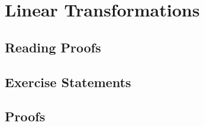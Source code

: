 \chapter{Linear Transformations}
\section{Reading Proofs}


\section{Exercise Statements}
\section{Proofs}

